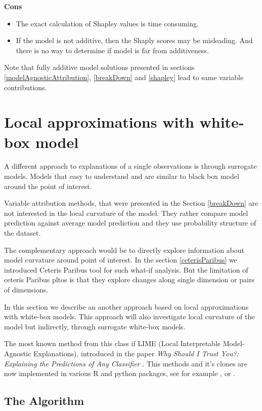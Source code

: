 \documentclass[]{book}
\providecommand{\tightlist}{%
  \setlength{\itemsep}{0pt}\setlength{\parskip}{0pt}}
\theoremstyle{definition}
\theoremstyle{definition}
\theoremstyle{definition}
\theoremstyle{remark}
\begin{document}
\textbf{Cons}

\begin{itemize}
\tightlist
\item
  The exact calculation of Shapley values is time consuming.
\item
  If the model is not additive, then the Shaply scores may be
  misleading. And there is no way to determine if model is far from
  additiveness.
\end{itemize}

Note that fully additive model solutions presented in sections
\ref{modelAgnosticAttribution}, \ref{breakDown} and \ref{shapley} lead
to same variable contributions.

\hypertarget{LIME}{%
\chapter{Local approximations with white-box model}\label{LIME}}

A different approach to explanations of a single observations is through
surrogate models. Models that easy to understand and are similar to
black box model around the point of interest.

Variable attribution methods, that were presented in the Section
\ref{breakDown} are not interested in the local curvature of the model.
They rather compare model prediction against average model prediction
and they use probability structure of the dataset.

The complementary approach would be to directly explore information
about model curvature around point of interest. In the section
\ref{ceterisParibus} we introduced Ceteris Paribus tool for such what-if
analysis. But the limitation of ceteris Paribus pltos is that they
explore changes along single dimension or pairs of dimensions.

In this section we describe an another approach based on local
approximations with white-box models. This approach will also
investigate local curvature of the model but indirectly, through
surrogate white-box models.

The most known method from this class if LIME (Local Interpretable
Model-Agnostic Explanations), introduced in the paper \emph{Why Should I
Trust You?: Explaining the Predictions of Any Classifier} \citep{lime}.
This methods and it's clones are now implemented in various R and python
packages, see for example \citep{R-lime}, \citep{R-live} or
\citep{R-iml}.

\hypertarget{the-algorithm-3}{%
\section{The Algorithm}\label{the-algorithm-3}}
\end{document}
